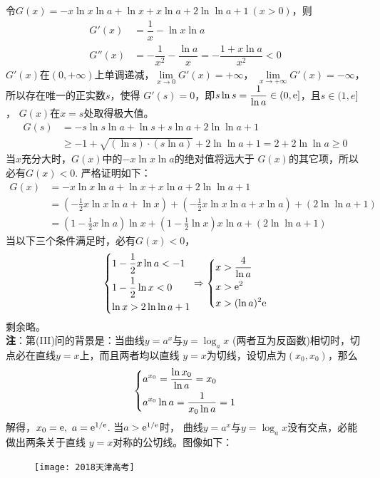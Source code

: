 \begin{enumerate}[label={【\textbf{例\thechapter.\arabic*}】},
 leftmargin=\inteval{\myenumleftmargin}pt,
 itemsep=\inteval{\myenumitempsep}pt,
 itemindent=\inteval{\myenumitemindent}pt]
令$ G(x)=-x\ln x\ln a+\ln x +x\ln a+2\ln\ln a+1\ (x>0) $，则
\begin{align*}
    G'(x)&=\dfrac{1}{x}-\ln x\ln a \\
    G''(x)&=-\dfrac{1}{x^2}-\dfrac{\ln a}{x}=-\dfrac{1+x\ln a}{x^2}<0
\end{align*}
$ G'(x) $在$ (0,+\infty) $上单调递减，$ \lim\limits_{x\to 0}G'(x)= +\infty $，
$ \lim\limits_{x\to +\infty}G'(x)= -\infty $，所以存在唯一的正实数$ s $，使得
$ G'(s)=0 $，即$ s\ln s=\dfrac{1}{\ln a}\in(0,\mathrm{e}] $，且$ s\in (1,e] $，
$ G(x) $在$ x=s $处取得极大值。
\begin{align*}
    G(s)&=-s\ln s\ln a+\ln s +s\ln a+2\ln\ln a+1 \\
    &\geq -1+\sqrt{(\ln s)\cdot (s\ln a)}+2\ln\ln a+1=2+2\ln\ln a\geq 0
\end{align*}
当$ x $充分大时，$ G(x) $中的$ -x\ln x\ln a $的绝对值将远大于
$ G(x) $的其它项，所以必有$ G(x)<0 $. 严格证明如下：
\begin{align*}
    G(x) &= -x\ln x\ln a+\ln x +x\ln a+2\ln\ln a+1 \\
    &=\left(-\frac{1}{2}x\ln x\ln a+\ln x\right)+
    \left(-\frac{1}{2}x\ln x\ln a+x\ln a\right)+(2\ln\ln a+1) \\
    &=\left(1-\frac{1}{2}x\ln a\right)\ln x+
    \left(1-\frac{1}{2}\ln x\right)x\ln a+(2\ln\ln a+1) 
\end{align*}
当以下三个条件满足时，必有$ G(x)<0 $，
\begin{gather*}
    \begin{dcases}
        1-\dfrac{1}{2}x\ln a < -1 \\
        1-\dfrac{1}{2}\ln x <0 \\
        \ln x>2\ln\ln a+1
    \end{dcases} \Rightarrow 
    \begin{dcases}
        x> \dfrac{4}{\ln a} \\
        x>\mathrm{e}^2 \\
        x>(\ln a)^2\mathrm{e}
    \end{dcases}
\end{gather*}
剩余略。\\
\textbf{注}：第(III)问的背景是：当曲线$ y=a^x $与$ y=\log_a x $
(两者互为反函数)相切时，切点必在直线$ y=x $上，而且两者均以直线
$ y=x $为切线，设切点为$ (x_0,x_0) $，那么
\begin{align*}
    \begin{dcases}
        a^{x_0}=\dfrac{\ln x_0}{\ln a}=x_0 \\
        a^{x_0}\ln a=\dfrac{1}{x_0\ln a}=1
    \end{dcases}
\end{align*}
解得，$ x_0=\e,\ a=\e^{1/\e} $. 当$ a>\mathrm{e}^{1/\mathrm{e}} $时，
曲线$ y=a^x $与$ y=\log_a x $没有交点，必能做出两条关于直线
$ y=x $对称的公切线。图像如下：
\begin{figure}[H]
    \centering
    \texttt{[image: 2018天津高考]}
\end{figure}


\end{enumerate}
